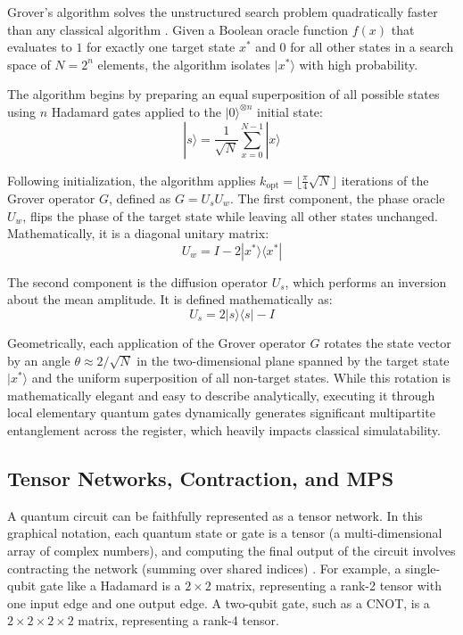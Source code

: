 \documentclass[sigconf, authorversion, nonacm]{acmart}
\begin{document}
Grover's algorithm solves the unstructured search problem quadratically faster than any classical algorithm \cite{Grover1996, NielsenChuang2010}. Given a Boolean oracle function $f(x)$ that evaluates to $1$ for exactly one target state $x^*$ and $0$ for all other states in a search space of $N = 2^n$ elements, the algorithm isolates $|x^*\rangle$ with high probability.

The algorithm begins by preparing an equal superposition of all possible states using $n$ Hadamard gates applied to the $|0\rangle^{\otimes n}$ initial state:
$$ |s\rangle = \frac{1}{\sqrt{N}} \sum_{x=0}^{N-1} |x\rangle $$

Following initialization, the algorithm applies $k_{\text{opt}} = \lfloor\frac{\pi}{4}\sqrt{N}\rfloor$ iterations of the Grover operator $G$, defined as $G = U_s U_w$. The first component, the phase oracle $U_w$, flips the phase of the target state while leaving all other states unchanged. Mathematically, it is a diagonal unitary matrix:
$$ U_w = I - 2|x^*\rangle\langle x^*| $$

The second component is the diffusion operator $U_s$, which performs an inversion about the mean amplitude. It is defined mathematically as:
$$ U_s = 2|s\rangle\langle s| - I $$

Geometrically, each application of the Grover operator $G$ rotates the state vector by an angle $\theta \approx 2/\sqrt{N}$ in the two-dimensional plane spanned by the target state $|x^*\rangle$ and the uniform superposition of all non-target states. While this rotation is mathematically elegant and easy to describe analytically, executing it through local elementary quantum gates dynamically generates significant multipartite entanglement across the register, which heavily impacts classical simulatability.

\subsection{Tensor Networks, Contraction, and MPS}

A quantum circuit can be faithfully represented as a tensor network. In this graphical notation, each quantum state or gate is a tensor (a multi-dimensional array of complex numbers), and computing the final output of the circuit involves contracting the network (summing over shared indices) \cite{Markov2008, Biamonte2017}. For example, a single-qubit gate like a Hadamard is a $2 \times 2$ matrix, representing a rank-2 tensor with one input edge and one output edge. A two-qubit gate, such as a CNOT, is a $2 \times 2 \times 2 \times 2$ matrix, representing a rank-4 tensor.
\end{document}
